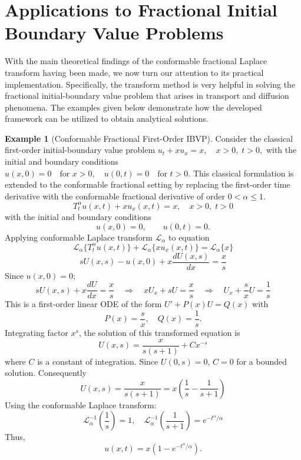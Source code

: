 \documentclass[two side,reqno,12pt]{amsart}
\numberwithin{equation}{section}
\theoremstyle{definition}
\newtheorem{example}[lemma]{Example}
\begin{document}
\section{Applications to Fractional Initial Boundary Value Problems}
With the main theoretical findings of the conformable fractional Laplace transform having been made, we now turn our attention to its practical implementation. Specifically, the transform method is very helpful in solving the fractional initial-boundary value problem that arises in transport and diffusion phenomena. The examples given below demonstrate how the developed framework can be utilized to obtain analytical solutions.
\begin{example}[Conformable Fractional First-Order IBVP]Consider the classical first-order initial-boundary value problem
$ 
u_t + x u_x = x, \quad x > 0, \; t > 0, 
$
with the initial and boundary conditions 
$ u(x,0) = 0 \quad \text{for } x > 0,\quad u(0,t) = 0 \quad \text{for } t > 0.
$
This classical formulation is extended to the conformable fractional setting by replacing the first-order time derivative with the conformable fractional derivative of order \(0 < \alpha \le 1\).
\[
    T_t^\alpha u(x,t) + x u_x(x,t) = x, \quad x > 0, \; t > 0 
\]
with the initial and boundary conditions
\[
    u(x,0) = 0, \qquad u(0,t) = 0.
\]
Applying conformable Laplace transform $\mathcal{L}_{\alpha}$ to equation
\[
   \mathcal{L}_{\alpha}\{T_t^\alpha u(x,t)\} +  \mathcal{L}_{\alpha}\{x u_x (x,t)\}= \mathcal{L}_{\alpha}\{x\} 
\]
\[
   sU(x,s) - u(x,0) + x \frac{dU(x,s)}{dx} = \frac{x}{s} 
\]
Since \( u(x,0) = 0 \);
\[
    s U(x,s) + x \frac{dU}{dx} = \frac{x}{s} \quad\Rightarrow \quad
xU_x + sU = \frac{x}{s} \quad\Rightarrow \quad   U_x + \frac{s}{x} U = \frac{1}{s}
\]
This is a first-order linear ODE of the form
$
U' + P(x)U = Q(x)
$
with
\[
  P(x) = \frac{s}{x}, \quad Q(x) = \frac{1}{s}.  
\]
Integrating factor $ x^{s}$,  the solution of this transformed equation is
\[
    U(x,s) = \frac{x}{s(s+1)} + C x^{-s}
\]
where \( C \) is a constant of integration. Since \( U(0,s) = 0 \), \( C = 0 \) for a bounded solution. Consequently
\[
   U(x,s) = \frac{x}{s(s+1)}= x\left( \frac{1}{s} - \frac{1}{s+1} \right)
\]
Using the conformable Laplace transform:
\[
    \mathcal{L}_{\alpha}^{-1}\!\left( \frac{1}{s} \right) = 1, \quad
\mathcal{L}_{\alpha}^{-1}\!\left( \frac{1}{s+1} \right) = e^{-t^{\alpha}/\alpha}
\]
Thus,
\[
    u(x,t) = x \left( 1 - e^{-t^{\alpha}/\alpha} \right).
\]
\end{example}
\end{document}
